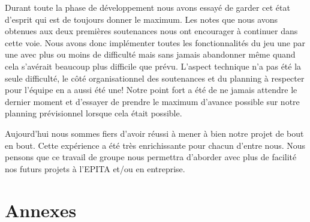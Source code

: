 \documentclass[11pt]{report}
\begin{document}
Durant toute la phase de développement nous avons essayé de garder cet état d'esprit qui est de toujours donner le maximum. Les notes que nous avons obtenues aux deux premières soutenances nous ont encourager à continuer dans cette voie. Nous avons donc implémenter toutes les fonctionnalités du jeu une par une avec plus ou moins de difficulté mais sans jamais abandonner même quand cela s'avérait beaucoup plus difficile que prévu. L'aspect technique n'a pas été la seule difficulté, le côté organisationnel des soutenances et du planning à respecter pour l'équipe en a aussi été une! Notre point fort a été de ne jamais attendre le dernier moment et d'essayer de prendre le maximum d'avance possible sur notre planning prévisionnel lorsque cela était possible.

Aujourd'hui nous sommes fiers d'avoir réussi à mener à bien notre projet de bout en bout. Cette expérience a été très enrichissante pour chacun d'entre nous. Nous pensons que ce travail de groupe nous permettra d'aborder avec plus de facilité nos futurs projets à l'EPITA et/ou en entreprise.

\newpage
{}
\part*{Annexes}


\nocite{*}


\newpage
\listoffigures

\newpage
\tableofcontents
 
\end{document}
